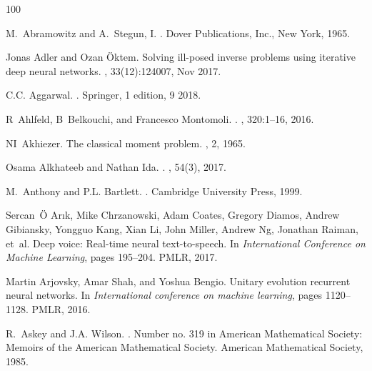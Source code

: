 \documentclass[a4paper,fleqn]{article}
\begin{document}
\begin{thebibliography}{100}

M.~Abramowitz and A.~Stegun, I.
.
\newblock Dover Publications, Inc., New York, 1965.

Jonas Adler and Ozan Öktem.
\newblock Solving ill-posed inverse problems using iterative deep neural
  networks.
, 33(12):124007, Nov 2017.

C.C. Aggarwal.
.
\newblock Springer, 1 edition, 9 2018.

R~Ahlfeld, B~Belkouchi, and Francesco Montomoli.
.
, 320:1--16, 2016.

NI~Akhiezer.
\newblock The classical moment problem.
, 2, 1965.

Osama Alkhateeb and Nathan Ida.
.
, 54(3), 2017.

M.~Anthony and P.L. Bartlett.
.
\newblock Cambridge University Press, 1999.

Sercan~{\"O} Ar{\i}k, Mike Chrzanowski, Adam Coates, Gregory Diamos, Andrew
  Gibiansky, Yongguo Kang, Xian Li, John Miller, Andrew Ng, Jonathan Raiman,
  et~al.
\newblock Deep voice: Real-time neural text-to-speech.
\newblock In {\em International Conference on Machine Learning}, pages
  195--204. PMLR, 2017.

Martin Arjovsky, Amar Shah, and Yoshua Bengio.
\newblock Unitary evolution recurrent neural networks.
\newblock In {\em International conference on machine learning}, pages
  1120--1128. PMLR, 2016.

R.~Askey and J.A. Wilson.
.
\newblock Number no. 319 in American Mathematical Society: Memoirs of the
  American Mathematical Society. American Mathematical Society, 1985.


\end{thebibliography}
\end{document}
